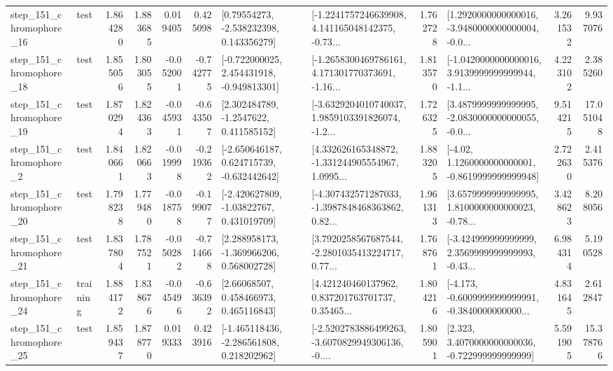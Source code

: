 \begin{tabular}{llrrrrllrlrr}
  step\_151\_chromophore\_16 &      test &      1.864280 &    1.883685 &      0.019405 &  0.425098 &     [0.79554273, -2.538232398, 0.143356279] &  [-1.2241757246639908, 4.141165048142375, -0.73... &       1.762728 &  [1.2920000000000016, -3.9480000000000004, -0.0... &            3.261532 &          9.937076 \\
  step\_151\_chromophore\_18 &      test &      1.855056 &    1.803055 &     -0.052001 & -0.742775 &   [-0.722000025, 2.454431918, -0.949813301] &  [-1.2658300469786161, 4.171301770373691, -1.16... &       1.813570 &  [-1.0420000000000016, 3.9139999999999944, -1.1... &            4.223102 &          2.385260 \\
  step\_151\_chromophore\_19 &      test &      1.870294 &    1.824363 &     -0.045931 & -0.643507 &      [2.302484789, -1.2547622, 0.411585152] &  [-3.6329204010740037, 1.9859103391826074, -1.2... &       1.726325 &  [3.4879999999999995, -2.0830000000000055, -0.0... &            9.514215 &         17.051048 \\
   step\_151\_chromophore\_2 &      test &      1.840661 &    1.820663 &     -0.019998 & -0.219362 &   [-2.650646187, 0.624715739, -0.632442642] &  [4.332626165348872, -1.331244905554967, 1.0995... &       1.883205 &   [-4.02, 1.1260000000000001, -0.8619999999999948] &            2.722630 &          2.415376 \\
  step\_151\_chromophore\_20 &      test &      1.798238 &    1.779480 &     -0.018758 & -0.199077 &    [-2.420627809, -1.03822767, 0.431019709] &  [-4.307432571287033, -1.3987848468363862, 0.82... &       1.961313 &  [3.6579999999999995, 1.8100000000000023, -0.78... &            3.428623 &          8.208056 \\
  step\_151\_chromophore\_21 &      test &      1.837804 &    1.787521 &     -0.050282 & -0.714668 &    [2.288958173, -1.369966206, 0.568002728] &  [3.7920258567687544, -2.2801035413224717, 0.77... &       1.768761 &  [-3.424999999999999, 2.3569999999999993, -0.43... &            6.984314 &          5.190528 \\
  step\_151\_chromophore\_24 &  training &      1.884172 &    1.838676 &     -0.045496 & -0.636392 &      [2.66068507, 0.458466973, 0.465116843] &  [4.421240460137962, 0.837201763701737, 0.35465... &       1.804216 &  [-4.173, -0.6009999999999991, -0.3840000000000... &            4.831645 &          2.612847 \\
  step\_151\_chromophore\_25 &      test &      1.859437 &    1.878770 &      0.019333 &  0.423916 &   [-1.465118436, -2.286561808, 0.218202962] &  [-2.5202783886499263, -3.6070829949306136, -0.... &       1.805901 &    [2.323, 3.4070000000000036, -0.722999999999999] &            5.591905 &         15.378766 \\

\end{tabular}
